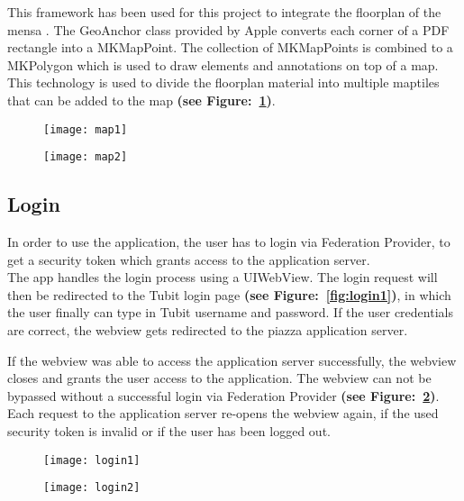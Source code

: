 This framework has been used for this project to integrate the floorplan of the mensa \cite{AppleFootprint}. The GeoAnchor class provided by Apple converts each corner of a PDF rectangle into a MKMapPoint. The collection of MKMapPoints is combined to a MKPolygon which is used to draw elements and annotations on top of a map. This technology is used to divide the floorplan material into multiple maptiles that can be added to the map \textbf{(see Figure:~\ref{fig:map2})}.


\begin{figure}
\centering
\begin{minipage}{.5\textwidth}
  \centering
  \texttt{[image: map1]}
  \label{fig:map1}
\end{minipage}%
\begin{minipage}{.5\textwidth}
  \centering
  \texttt{[image: map2]}
  \label{fig:map2}
\end{minipage}
\end{figure}


\subsection{Login}

In order to use the application, the user has to login via Federation Provider, to get
a security token which grants access to the application server. \\

The app handles the login process using a UIWebView. The login request will then be redirected
to the Tubit login page \textbf{(see Figure:~\ref{fig:login1})}, in which the user finally can type in Tubit username and password.
If the user credentials are correct, the webview gets redirected to the piazza application server.

If the webview was able to access the application server successfully, the webview closes and grants the user access to the application. The webview can not be bypassed without a successful login via Federation Provider \textbf{(see Figure:~\ref{fig:login2})}. Each request to the application server re-opens the webview again, if the used security token is invalid or if the user has been logged out.


\begin{figure}
\centering
\begin{minipage}{.5\textwidth}
  \centering
  \texttt{[image: login1]}
  \label{fig:login1}
\end{minipage}%
\begin{minipage}{.5\textwidth}
  \centering
  \texttt{[image: login2]}
  \label{fig:login2}
\end{minipage}
\end{figure}

